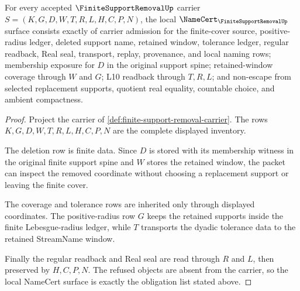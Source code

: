 \begin{theorem}
\label{thm:finite-support-removal-namecert-obligations}
For every accepted $\FiniteSupportRemovalUp$ carrier $S=(K,G,D,W,T,R,L,H,C,P,N)$, the local $\NameCert_{\FiniteSupportRemovalUp}$ surface consists exactly of carrier admission for the finite-cover source, positive-radius ledger, deleted support name, retained window, tolerance ledger, regular readback, Real seal, transport, replay, provenance, and local naming rows; membership exposure for $D$ in the original support spine; retained-window coverage through $W$ and $G$; L10 readback through $T,R,L$; and non-escape from selected replacement supports, quotient real equality, countable choice, and ambient compactness.
\end{theorem}
\begin{proof}
Project the carrier of \autoref{def:finite-support-removal-carrier}. The rows $K,G,D,W,T,R,L,H,C,P,N$ are the complete displayed inventory.

The deletion row is finite data. Since $D$ is stored with its membership witness in the original finite support spine and $W$ stores the retained window, the packet can inspect the removed coordinate without choosing a replacement support or leaving the finite cover.

The coverage and tolerance rows are inherited only through displayed coordinates. The positive-radius row $G$ keeps the retained supports inside the finite Lebesgue-radius ledger, while $T$ transports the dyadic tolerance data to the retained StreamName window.

Finally the regular readback and Real seal are read through $R$ and $L$, then preserved by $H,C,P,N$. The refused objects are absent from the carrier, so the local NameCert surface is exactly the obligation list stated above.
\end{proof}

